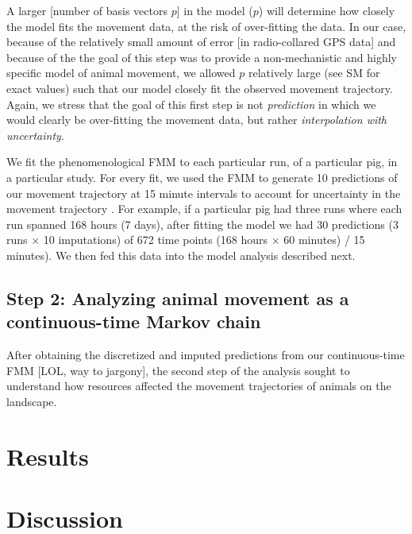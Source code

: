 \documentclass[a4paper]{article}
\begin{document}
A larger [number of basis vectors $p$] in the model ($p$) will determine how closely the model fits the movement data, at the risk of over-fitting the data.  In our case, because of the relatively small amount of error [in radio-collared GPS data] and because of the the goal of this step was to provide a non-mechanistic and highly specific model of animal movement, we allowed $p$ relatively large (see SM for exact values) such that our model closely fit the observed movement trajectory.  Again, we stress that the goal of this first step is not \emph{prediction} in which we would clearly be over-fitting the movement data, but rather \emph{interpolation with uncertainty}.

We fit the phenomenological FMM to each particular run, of a particular pig, in a particular study.  For every fit, we used the FMM to generate 10 predictions of our movement trajectory at 15 minute intervals to account for uncertainty in the movement trajectory \citep{Hanks2015,Buderman2018}.  For example, if a particular pig had three runs where each run spanned 168 hours (7 days), after fitting the model we had 30 predictions (3 runs $\times$ 10 imputations) of 672 time points (168 hours $\times$ 60 minutes) / 15 minutes).  We then fed this data into the model analysis described next. 

\subsection*{Step 2: Analyzing animal movement as a continuous-time Markov chain}

After obtaining the discretized and imputed predictions from our continuous-time FMM [LOL, way to jargony], the second step of the analysis sought to understand how resources affected the movement trajectories of animals on the landscape.




\section*{Results}


\section*{Discussion}

\singlespacing





\end{document}
